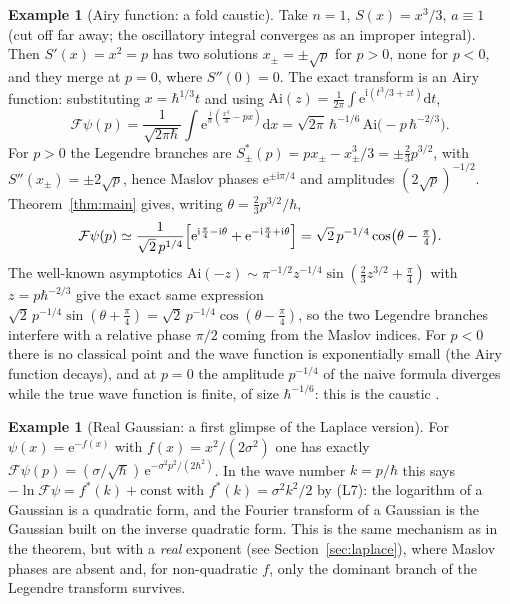 \documentclass[11pt,a4paper]{article}
\newcommand{\ii}{\mathrm{i}}
\newcommand{\dd}{\mathrm{d}}
\newcommand{\ee}{\mathrm{e}}
\newcommand{\hb}{\hbar}
\newcommand{\FT}{\mathcal{F}}
\theoremstyle{plain}
\theoremstyle{definition}
\newtheorem{example}[theorem]{Example}
\theoremstyle{remark}
\begin{document}
\begin{example}[Airy function: a fold caustic]\label{ex:Airy}
Take $n=1$, $S(x)=x^3/3$, $a\equiv1$ (cut off far away; the oscillatory integral converges as an improper integral). Then $S'(x)=x^2=p$ has two solutions $x_\pm=\pm\sqrt p$ for $p>0$, none for $p<0$, and they merge at $p=0$, where $S''(0)=0$. The exact transform is an Airy function: substituting $x=\hb^{1/3}t$ and using $\mathrm{Ai}(z)=\frac1{2\pi}\int\ee^{\ii(t^3/3+zt)}\dd t$,
\begin{equation}
\FT\psi(p)=\frac{1}{\sqrt{2\pi\hb}}\int\ee^{\frac{\ii}{\hb}(\frac{x^3}{3}-px)}\dd x=\sqrt{2\pi}\,\hb^{-1/6}\,\mathrm{Ai}\bigl(-p\,\hb^{-2/3}\bigr).
\end{equation}
For $p>0$ the Legendre branches are $S_\pm^*(p)=p x_\pm-x_\pm^3/3=\pm\tfrac23p^{3/2}$, with $S''(x_\pm)=\pm2\sqrt p$, hence Maslov phases $\ee^{\pm\ii\pi/4}$ and amplitudes $(2\sqrt p)^{-1/2}$. Theorem~\ref{thm:main} gives, writing $\theta=\tfrac23p^{3/2}/\hb$,
\begin{equation}
\FT\psi(p)\simeq\frac{1}{\sqrt2\,p^{1/4}}\Bigl[\ee^{\ii\frac\pi4-\ii\theta}+\ee^{-\ii\frac\pi4+\ii\theta}\Bigr]=\sqrt2\,p^{-1/4}\cos\bigl(\theta-\tfrac\pi4\bigr).
\end{equation}
The well-known asymptotics $\mathrm{Ai}(-z)\sim\pi^{-1/2}z^{-1/4}\sin(\tfrac23z^{3/2}+\tfrac\pi4)$ with $z=p\hb^{-2/3}$ give the exact same expression $\sqrt2\,p^{-1/4}\sin(\theta+\tfrac\pi4)=\sqrt2\,p^{-1/4}\cos(\theta-\tfrac\pi4)$, so the two Legendre branches interfere with a relative phase $\pi/2$ coming from the Maslov indices. For $p<0$ there is no classical point and the wave function is exponentially small (the Airy function decays), and at $p=0$ the amplitude $p^{-1/4}$ of the naive formula diverges while the true wave function is finite, of size $\hb^{-1/6}$: this is the caustic \cite{Berry,Duistermaat}.
\end{example}

\begin{example}[Real Gaussian: a first glimpse of the Laplace version]\label{ex:gauss}
For $\psi(x)=\ee^{-f(x)}$ with $f(x)=x^2/(2\sigma^2)$ one has exactly $\FT\psi(p)=(\sigma/\sqrt\hb)\,\ee^{-\sigma^2p^2/(2\hb^2)}$. In the wave number $k=p/\hb$ this says $-\ln\FT\psi=f^*(k)+\text{const}$ with $f^*(k)=\sigma^2k^2/2$ by (L7): the logarithm of a Gaussian is a quadratic form, and the Fourier transform of a Gaussian is the Gaussian built on the inverse quadratic form. This is the same mechanism as in the theorem, but with a \emph{real} exponent (see Section~\ref{sec:laplace}), where Maslov phases are absent and, for non-quadratic $f$, only the dominant branch of the Legendre transform survives.
\end{example}
\end{document}
